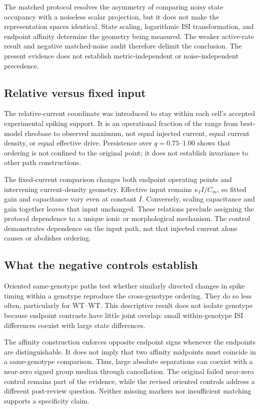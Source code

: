 \documentclass[utf8]{FrontiersinHarvard}
\begin{document}
The matched protocol resolves the asymmetry of comparing noisy state occupancy with a noiseless scalar projection, but it does not make the representation spaces identical. State scaling, logarithmic ISI transformation, and endpoint affinity determine the geometry being measured. The weaker active-rate result and negative matched-noise audit therefore delimit the conclusion. The present evidence does not establish metric-independent or noise-independent precedence.

\subsection{Relative versus fixed input}
The relative-current coordinate was introduced to stay within each cell's accepted experimental spiking support. It is an operational fraction of the range from best-model rheobase to observed maximum, not equal injected current, equal current density, or equal effective drive. Persistence over $q=0.75$--1.00 shows that ordering is not confined to the original point; it does not establish invariance to other path constructions.

The fixed-current comparison changes both endpoint operating points and intervening current-density geometry. Effective input remains $\kappa_I I/C_m$, so fitted gain and capacitance vary even at constant $I$. Conversely, scaling capacitance and gain together leaves that input unchanged. These relations preclude assigning the protocol dependence to a unique ionic or morphological mechanism. The control demonstrates dependence on the input path, not that injected current alone causes or abolishes ordering.

\subsection{What the negative controls establish}
Oriented same-genotype paths test whether similarly directed changes in spike timing within a genotype reproduce the cross-genotype ordering. They do so less often, particularly for WT--WT. This descriptive result does not isolate genotype because endpoint contrasts have little joint overlap: small within-genotype ISI differences coexist with large state differences.

The affinity construction enforces opposite endpoint signs whenever the endpoints are distinguishable. It does not imply that two affinity midpoints must coincide in a same-genotype comparison. Thus, large absolute separations can coexist with a near-zero signed group median through cancellation. The original failed near-zero control remains part of the evidence, while the revised oriented controls address a different post-review question. Neither missing markers nor insufficient matching supports a specificity claim.
\end{document}
